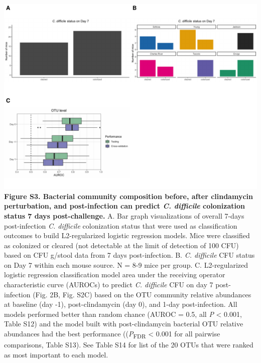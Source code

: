\documentclass[
  11pt,
]{article}
\begin{document}
\includegraphics{figure_S3.pdf} \textbf{Figure S3. Bacterial community
composition before, after clindamycin perturbation, and post-infection
can predict \emph{C. difficile} colonization status 7 days
post-challenge.} A. Bar graph visualizations of overall 7-days
post-infection \emph{C. difficile} colonization status that were used as
classification outcomes to build L2-regularized logistic regression
models. Mice were classified as colonized or cleared (not detectable at
the limit of detection of 100 CFU) based on CFU g/stool data from 7 days
post-infection. B. \emph{C. difficile} CFU status on Day 7 within each
mouse source. N = 8-9 mice per group. C. L2-regularized logistic
regression classification model area under the receiving operator
characteristic curve (AUROCs) to predict \emph{C. difficile} CFU on day
7 post-infection (Fig. 2B, Fig. S2C) based on the OTU community relative
abundances at baseline (day -1), post-clindamycin (day 0), and 1-day
post-infection. All models performed better than random chance (AUROC =
0.5, all \emph{P} \textless{} 0.001, Table S12) and the model built with
post-clindamycin bacterial OTU relative abundances had the best
performance ((\emph{P}\textsubscript{FDR} \textless{} 0.001 for all
pairwise comparisons, Table S13). See Table S14 for list of the 20 OTUs
that were ranked as most important to each model.

\newpage
\end{document}
